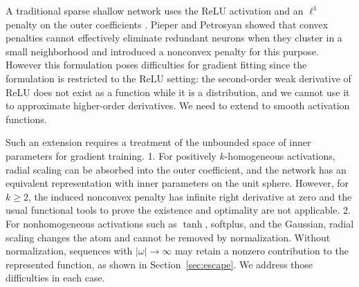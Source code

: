 \documentclass[11pt]{amsart}
\theoremstyle{definition}
\theoremstyle{remark}
\begin{document}
A traditional sparse shallow network uses the ReLU activation and an
$\ell^1$ penalty on the outer coefficients
\cite{bengio2005convex,bach2017breaking}.  
Pieper and Petrosyan \cite{pieper2022nonconvex} showed that convex penalties
cannot effectively eliminate redundant neurons when they cluster in a small
neighborhood and introduced a nonconvex penalty for this purpose.
However this formulation poses difficulties for gradient fitting since the formulation is restricted to the ReLU setting:
the second-order weak derivative of ReLU does not exist as a function while it is a distribution, and we cannot
use it to approximate higher-order derivatives.
We need to extend to smooth activation functions.


Such an extension requires a treatment of the unbounded space of inner
parameters for gradient training.
1. For positively $k$-homogeneous activations, radial scaling can be absorbed
into the outer coefficient, and the network has an equivalent representation
with inner parameters on the unit sphere. 
However, for $k\ge2$, the induced nonconvex penalty has infinite right derivative at zero
and the usual functional tools to prove the existence and optimality are not applicable. 
2. For nonhomogeneous activations such
as $\tanh$, softplus, and the Gaussian, radial scaling changes the atom and
cannot be removed by normalization. Without normalization, sequences
with $|\omega|\to\infty$ may retain a nonzero contribution to the represented
function, as shown in Section~\ref{sec:escape}. We address those difficulties in each case.
\end{document}

